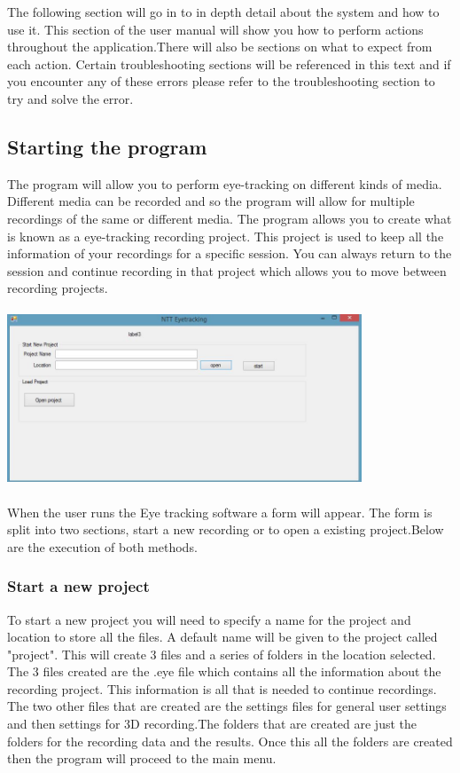 The following section will go in to in depth detail about the system and how to use it. This section of the user manual will show you how to perform actions throughout the application.There will also be sections on what to expect from each action. Certain troubleshooting sections will be referenced in this text and if you encounter any of these errors please refer to the troubleshooting section to try and solve the error.

\subsection{Starting the program}
The program will allow you to perform eye-tracking on different kinds of media. Different media can be recorded and so the program will allow for multiple recordings of the same or different media. The program allows you to create what is known as a eye-tracking recording project. This project is used to keep all the information of your recordings for a specific session. You can always return to the session and continue recording in that project which allows you to move between recording projects.\newline

\includegraphics[width=400px,height=200px]{./Images/Startpage.JPG}

When the user runs the Eye tracking software a form will appear. The form is split into two sections, start a new recording or to open a existing project.Below are the execution of both methods.

\subsubsection{Start a new project} 
To start a new project you will need to specify a name for the project and location to store all the files. A default name will be given to the project called "project". This will create 3 files and a series of folders in the location selected. The 3 files created are the .eye file which contains all the information about the recording project. This information is all that is needed to continue recordings. The two other files that are created are the settings files for general user settings and then settings for 3D recording.The folders that are created are just the folders for the recording data and the results. Once this all the folders are created then the program will proceed to the main menu.

